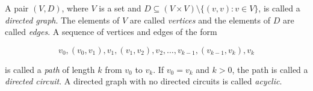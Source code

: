 A pair $(V, D)$, where $V$ is a set and $D \subseteq (V \times V) \setminus \{(v, v): v \in V\}$, is called a \textit{directed graph}. The elements of $V$ are called \textit{vertices} and the elements of $D$ are called \textit{edges}. A sequence of vertices and edges of the form

$$v_0, (v_0, v_1), v_1, (v_1, v_2), v_2, \dots, v_{k-1}, (v_{k-1}, v_k), v_k$$

is called a \textit{path} of length $k$ from $v_0$ to $v_k$. If $v_0 = v_k$ and $k > 0$, the path is called a \textit{directed circuit}. A directed graph with no directed circuits is called \textit{acyclic}.
